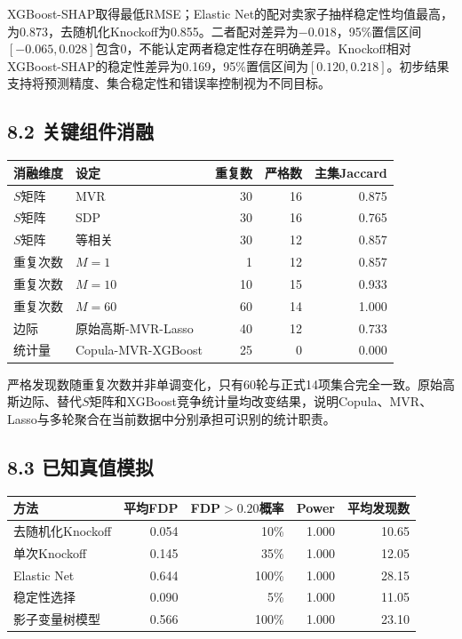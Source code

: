\documentclass[UTF8,12pt,a4paper]{ctexart}
\begin{document}
XGBoost-SHAP取得最低RMSE；Elastic Net的配对卖家子抽样稳定性均值最高，为0.873，去随机化Knockoff为0.855。二者配对差异为$-0.018$，95\%置信区间$[-0.065,0.028]$包含0，不能认定两者稳定性存在明确差异。Knockoff相对XGBoost-SHAP的稳定性差异为0.169，95\%置信区间为$[0.120,0.218]$。初步结果支持将预测精度、集合稳定性和错误率控制视为不同目标。

\subsection*{8.2 关键组件消融}

\begin{center}
\scriptsize
\renewcommand{\arraystretch}{1.10}
\begin{tabular}{llrrr}
\toprule
消融维度 & 设定 & 重复数 & 严格数 & 主集Jaccard\\
\midrule
$S$矩阵 & MVR & 30 & 16 & 0.875\\
$S$矩阵 & SDP & 30 & 16 & 0.765\\
$S$矩阵 & 等相关 & 30 & 12 & 0.857\\
重复次数 & $M=1$ & 1 & 12 & 0.857\\
重复次数 & $M=10$ & 10 & 15 & 0.933\\
重复次数 & $M=60$ & 60 & 14 & 1.000\\
边际 & 原始高斯-MVR-Lasso & 40 & 12 & 0.733\\
统计量 & Copula-MVR-XGBoost & 25 & 0 & 0.000\\
\bottomrule
\end{tabular}
\end{center}

严格发现数随重复次数并非单调变化，只有60轮与正式14项集合完全一致。原始高斯边际、替代$S$矩阵和XGBoost竞争统计量均改变结果，说明Copula、MVR、Lasso与多轮聚合在当前数据中分别承担可识别的统计职责。

\newpage
\subsection*{8.3 已知真值模拟}

\begin{center}
\small
\renewcommand{\arraystretch}{1.18}
\begin{tabular}{lrrrr}
\toprule
方法 & 平均FDP & FDP$>0.20$概率 & Power & 平均发现数\\
\midrule
去随机化Knockoff & 0.054 & 10\% & 1.000 & 10.65\\
单次Knockoff & 0.145 & 35\% & 1.000 & 12.05\\
Elastic Net & 0.644 & 100\% & 1.000 & 28.15\\
稳定性选择 & 0.090 & 5\% & 1.000 & 11.05\\
影子变量树模型 & 0.566 & 100\% & 1.000 & 23.10\\
\bottomrule
\end{tabular}
\end{center}
\end{document}
